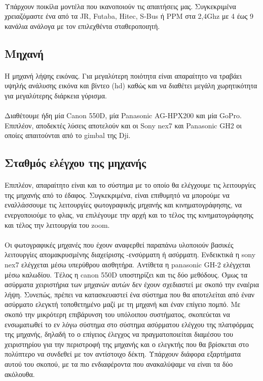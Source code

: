 \documentclass[a4paper, 12pt, twoside]{report}
\begin{document}
{{{{{{			\paragraph{}{Υπάρχουν ποικίλα μοντέλα που ικανοποιούν τις απαιτήσεις μας. Συγκεκριμένα χρειαζόμαστε ένα από τα JR, Futaba, Hitec, S-Bus ή PPM στα 2,4Ghz με 4 έως 9 κανάλια ανάλογα με τον επιλεχθέντα σταθεροποιητή.
			}
		
		\subsection{Μηχανή}
			\paragraph{}{Η μηχανή λήψης εικόνας. Για μεγαλύτερη ποιότητα είναι απαραίτητο να τραβάει υψηλής ανάλυσης εικόνα και βίντεο (hd) καθώς και να διαθέτει μεγάλη χωρητικότητα για μεγαλύτερης διάρκεια γύρισμα.
			}
			\paragraph{}{Διαθέτουμε ήδη μία Canon 550D, μία Panasonic AG-HPX200 και μία GoPro. Επιπλέον, αποδεκτές λύσεις αποτελούν και οι Sony nex7 και Panasonic GH2 οι οποίες απαιτούνται από το gimbal της Dji.
			}
		
		\subsection{Σταθμός ελέγχου της μηχανής}	
			\paragraph{}{Επιπλέον, απαραίτητο είναι και το σύστημα με το οποίο θα ελέγχουμε τις λειτουργίες της μηχανής από το έδαφος. Συγκεκριμένα, είναι επιθυμητό να μπορούμε να εναλλάσσουμε τις λειτουργίες φωτογραφικής μηχανής και κινηματογράφησης, να ενεργοποιούμε το φλας, να επιλέγουμε την αρχή και το τέλος της κινηματογράφησης και τέλος την λειτουργία του zoom.
			}
			\paragraph{}{Οι φωτογραφικές μηχανές που έχουν αναφερθεί παραπάνω υλοποιούν βασικές λειτουργίες απομακρυσμένης διαχείρισης -ενσύρματη ή ασύρματη. Ενδεικτικά η sony nex7 ελέγχεται μέσω υπερύθρου αισθητήρα. Αντίθετα η panasonic GH-2 ελέγχεται μέσω καλωδίου. Τέλος η canon 550D υποστηρίζει και τις δύο μεθόδους. Όμως τα ασύρματα χειριστήρια των μηχανών αυτών δεν έχουν σχεδιαστεί με σκοπό την εναέρια λήψη. Συνεπώς, πρέπει να κατασκευαστεί ένα σύστημα που θα αποτελείται από έναν ασύρματο ελεγκτή τοποθετημένο μαζί με τη μηχανή και έναν επίγειο πομπό. Με σκοπό την μικρότερη επιβάρυνση του υπόλοιπου συστήματος, σκοπεύεται να ενσωματωθεί το εν λόγω σύστημα στο σύστημα ασύρματου ελέγχου της πλατφόρμας της μηχανής, δηλαδή το ο επίγειος έλεγχος να πραγματοποιείται διαμέσου του χειριστηρίου για την περιστροφή της μηχανής και ο ελεγκτής που θα βρίσκεται στο πολύπτερο να συνδεθεί με τον αντίστοιχο δέκτη. Υπάρχουν διάφορα εξαρτήματα αυτού του σκοπού, με τα πιο ενδιαφέροντα που ανακαλύψαμε να είναι τα δύο ακόλουθα.
			}
}}}}}}
\end{document}
